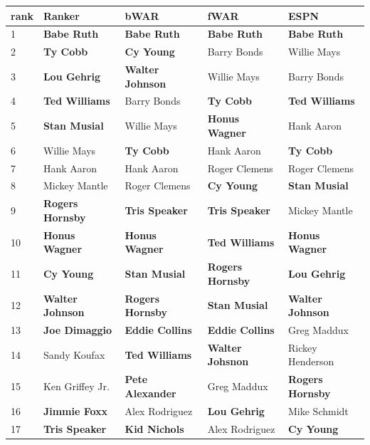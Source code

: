 \documentclass[11pt]{article}\usepackage[]{graphicx}\usepackage[]{color}
\begin{document}
\begin{table}[h!]
\begin{center}
\begin{tabular}{lllll}
\hline
rank & Ranker & bWAR & fWAR & ESPN \\
\hline
1  & {\bf Babe Ruth}         & {\bf Babe Ruth}      & {\bf Babe Ruth}      & {\bf Babe Ruth}      \\
2  & {\bf Ty Cobb}           & {\bf Cy Young}       & Barry Bonds          & Willie Mays          \\
3  & {\bf Lou Gehrig}        & {\bf Walter Johnson} & Willie Mays          & Barry Bonds          \\
4  & {\bf Ted Williams}      & Barry Bonds          & {\bf Ty Cobb}        & {\bf Ted Williams}   \\
5  & {\bf Stan Musial}       & Willie Mays          & {\bf Honus Wagner}   & Hank Aaron           \\
6  & Willie Mays             & {\bf Ty Cobb}        & Hank Aaron           & {\bf Ty Cobb}        \\
7  & Hank Aaron              & Hank Aaron           & Roger Clemens        & Roger Clemens        \\
8  & Mickey Mantle           & Roger Clemens        & {\bf Cy Young}       & {\bf Stan Musial}    \\
9  & {\bf Rogers Hornsby}    & {\bf Tris Speaker}   & {\bf Tris Speaker}   & Mickey Mantle        \\
10 & {\bf Honus Wagner}      & {\bf Honus Wagner}   & {\bf Ted Williams}   & {\bf Honus Wagner}   \\
11 & {\bf Cy Young}          & {\bf Stan Musial}    & {\bf Rogers Hornsby} & {\bf Lou Gehrig}     \\
12 & {\bf Walter Johnson}    & {\bf Rogers Hornsby} & {\bf Stan Musial}    & {\bf Walter Johnson} \\
13 & {\bf Joe Dimaggio}      & {\bf Eddie Collins}  & {\bf Eddie Collins}  & Greg Maddux          \\
14 & Sandy Koufax            & {\bf Ted Williams}   & {\bf Walter Johsnon} & Rickey Henderson     \\ 
15 & Ken Griffey Jr.         & {\bf Pete Alexander} & Greg Maddux          & {\bf Rogers Hornsby} \\
16 & {\bf Jimmie Foxx}       & Alex Rodriguez       & {\bf Lou Gehrig}     & Mike Schmidt         \\
17 & {\bf Tris Speaker}      & {\bf Kid Nichols}    & Alex Rodriguez       & {\bf Cy Young}       \\

\end{tabular}
\end{center}
\end{table}
\end{document}
